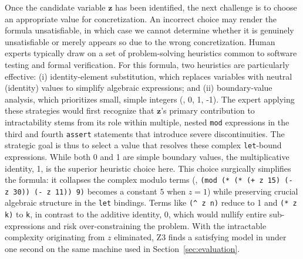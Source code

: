 Once the candidate variable $\mathbf{z}$ has been identified, the next challenge is to choose an appropriate value for concretization. An incorrect choice may render the formula unsatisfiable, in which case we cannot determine whether it is genuinely unsatisfiable or merely appears so due to the wrong concretization.
Human experts typically draw on a set of problem-solving heuristics common to software testing and formal verification. For this formula, two heuristics are particularly effective: (i) identity-element substitution, which replaces variables with neutral (identity) values to simplify algebraic expressions; and (ii) boundary-value analysis, which prioritizes small, simple integers (\eg{}, 0, 1, -1).
The expert applying these strategies would first recognize that $\mathbf{z}$'s primary contribution to intractability stems from its role within multiple, nested \texttt{mod} expressions in the third and fourth \texttt{assert} statements that introduce severe discontinuities. The strategic goal is thus to select a value that resolves these complex \texttt{let}-bound expressions. While both 0 and 1 are simple boundary values, the multiplicative identity, 1, is the superior heuristic choice here.
This choice surgically simplifies the formula: it collapses the complex modulo terms (\eg, \texttt{(mod (* (* (+ z 15) (- z 30)) (- z 11)) 9)} becomes a constant $5$ when $z=1$) while preserving crucial algebraic structure in the \texttt{let} bindings. Terms like \texttt{(\textasciicircum{} z n)} reduce to 1 and \texttt{(* z k)} to \texttt{k}, in contrast to the additive identity, 0, which would nullify entire sub-expressions and risk over-constraining the problem. With the intractable complexity originating from $z$ eliminated, Z3 finds a satisfying model in under one second on the same machine used in Section~\ref{sec:evaluation}.

